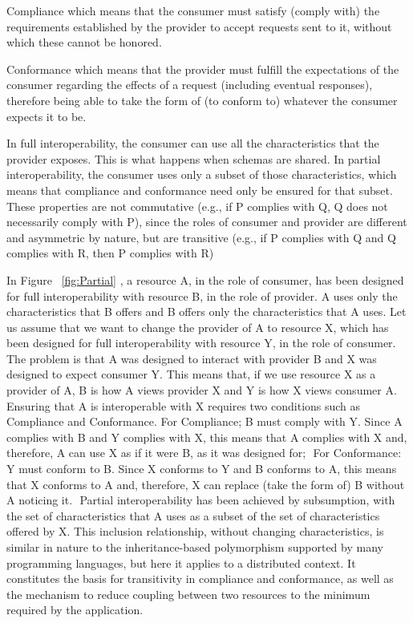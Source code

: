 Compliance\citep{compliance:def} which means that the consumer must satisfy (comply with) the requirements established
by the provider to accept requests sent to it, without which these cannot be honored.

Conformance\citep{comformance:def} which means that the provider must fulfill the expectations of the consumer
regarding the effects of a request (including eventual responses), therefore being able to take the form
of (to conform to) whatever the consumer expects it to be. 

In full interoperability, the consumer can use all the characteristics that the provider exposes.
This is what happens when schemas are shared. In partial interoperability, the consumer uses only a subset of
those characteristics, which means that compliance and conformance need only be ensured for that subset.
These properties are not commutative (e.g., if P complies with Q, Q does not necessarily comply with P), since the
roles of consumer and provider are different and asymmetric by nature, but are transitive (e.g., if P complies with
Q and Q complies with R, then P complies with R)

In Figure ~\ref{fig:Partial} , a resource A, in the role of consumer, has been designed for full interoperability
with resource B, in the role of provider. A uses only the characteristics that B offers and B offers only the
characteristics that A uses. Let us assume that we want to change the provider of A to resource X, which has been
designed for full interoperability with resource Y, in the role of consumer. The problem is that A was designed to
interact with provider B and X was designed to expect consumer Y. This means that, if we use resource X as a
provider of A, B is how A views provider X and Y is how X views consumer A. Ensuring that A is interoperable with
X requires two conditions such as Compliance and Conformance.
For Compliance; B must comply with Y. Since A complies with B and Y complies with X, this means that A complies with
X and, therefore, A can use X as if it were B, as it was designed for; 
For Conformance: Y must conform to B. Since X conforms to Y and B conforms to A, this means that X conforms to
A and, therefore, X can replace (take the form of) B without A noticing it.  Partial interoperability has been achieved by subsumption, with the set of characteristics that A uses as a subset of the set of characteristics
offered by X. This inclusion relationship, without changing characteristics, is similar in nature to the
inheritance-based polymorphism supported by many programming languages, but here it applies to a distributed context. It constitutes the basis for transitivity in compliance and conformance, as well as the mechanism to reduce coupling between two resources to the minimum required by the application. 
